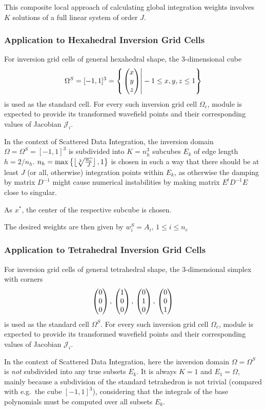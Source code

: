 This composite local approach of calculating global integration weights involves $K$ solutions of a full 
linear system of order $J$. 
%
\subsubsection{Application to Hexahedral Inversion Grid Cells}
%
For inversion grid cells of general hexahedral shape, the 3-dimensional cube 
\[\Omega^S = [-1,1]^3 = \left\{ \left. \begin{pmatrix} x \\ y \\ z \end{pmatrix} \right| -1 \le x,y,z \le 1 \right\}\]
is used as the standard cell. For every such inversion grid cell $\Omega_c$, module  
is expected to provide its transformed wavefield points \wpS and their corresponding values of Jacobian 
$\mathcal{J}_i$.

In the context of Scattered Data Integration, the inversion domain $\Omega=\Omega^S=[-1,1]^3$ is subdivided into
$K = n_h^3$ subcubes $E_k$ of edge length $h=2/n_h$. $n_h=\max\left\{ \left\lfloor\sqrt[3]{\frac{n_c}{J}}\right\rfloor,1 \right\}$ 
is chosen in such a way that there should be at least $J$ (or all, otherwise) integration points within $E_k$, as 
otherwise the damping by matrix $D^{-1}$ might cause numerical instabilities by making matrix $E^tD^{-1}E$ close 
to singular. 

As $x^\ast$, the center of the respective subcube is chosen.

The desired weights \weightsS are then given by $w^S_i = A_i,\,1\le i\le n_c$
%
\subsubsection{Application to Tetrahedral Inversion Grid Cells}
%
For inversion grid cells of general tetrahedral shape, the 3-dimensional simplex with corners
\[
\begin{pmatrix} 0 \\ 0 \\ 0 \end{pmatrix} ,\, \begin{pmatrix} 1 \\ 0 \\ 0 \end{pmatrix} ,\, \begin{pmatrix} 0 \\ 1 \\ 0 \end{pmatrix} ,\, \begin{pmatrix} 0 \\ 0 \\ 1 \end{pmatrix}
\]
is used as the standard cell $\Omega^S$. For every such inversion grid cell $\Omega_c$, module 
 is expected to provide its transformed wavefield points \wpS and their 
corresponding values of Jacobian $\mathcal{J}_i$.

In the context of Scattered Data Integration, here the inversion domain $\Omega = \Omega^S$ is \emph{not} 
subdivided into any true subsets $E_k$. It is always $K=1$ and $E_1 = \Omega$, mainly because a subdivision 
of the standard tetrahedron is not trivial (compared with e.g.\ the cube $[-1,1]^3$), considering that the integrals 
of the base polynomials must be computed over all subsets $E_k$. 

